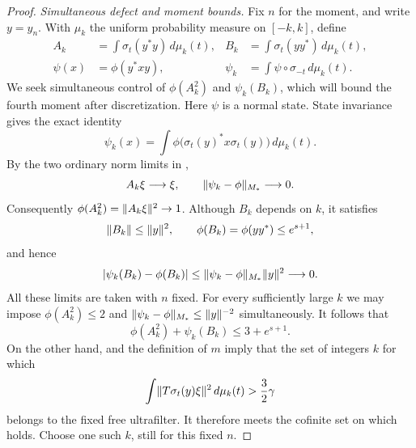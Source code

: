 \begin{proof}
\smallskip
\noindent\emph{Simultaneous defect and moment bounds.}
Fix $n$ for the moment, and write $y=y_n$.  With $\mu_k$ the uniform
probability measure on $[-k,k]$, define
\[
 \begin{aligned}
 A_k&=\int\sigma_t(y^*y)\,d\mu_k(t),&
 B_k&=\int\sigma_t(yy^*)\,d\mu_k(t),\\
 \psi(x)&=\phi(y^*xy),&
 \psi_k&=\int\psi\circ\sigma_{-t}\,d\mu_k(t).
 \end{aligned}
\]
We seek simultaneous control of $\phi(A_k^2)$ and $\psi_k(B_k)$, which
will bound the fourth moment after discretization. Here $\psi$ is a
normal state. State invariance gives the exact identity
\begin{equation}
\label{eq:recovery-functional}
 \psi_k(x)=
 \int\phi\bigl(\sigma_t(y)^*x\sigma_t(y)\bigr)\,d\mu_k(t).
\end{equation}
By the two ordinary norm limits in ,
\[
 A_k\xi\longrightarrow\xi,\qquad
 \lVert\psi_k-\phi\rVert_{M_*}\longrightarrow0.
\]
Consequently $\phi(A_k^2)=\lVert A_k\xi\rVert^{2}\to1$.  Although $B_k$
depends on $k$, it satisfies
\[
 \lVert B_k\rVert\le\lVert y\rVert^{2},\qquad
 \phi(B_k)=\phi(yy^*)\le e^{s+1},
\]
and hence
\begin{equation}
\label{eq:recovery-varying-test}
 \lvert\psi_k(B_k)-\phi(B_k)\rvert
 \le\lVert\psi_k-\phi\rVert_{M_*}\lVert y\rVert^{2}\longrightarrow0.
\end{equation}
All these limits are taken with $n$ fixed.  For every sufficiently large
$k$ we may impose $\phi(A_k^2)\le2$ and
$\lVert\psi_k-\phi\rVert_{M_*}\le\lVert y\rVert^{-2}$ simultaneously.  It follows that
\begin{equation}
\label{eq:recovery-continuous-moments}
 \phi(A_k^2)+\psi_k(B_k)\le3+e^{s+1}.
\end{equation}
On the other hand,  and the definition of $m$
imply that the set of integers $k$ for which
\[
 \int\lVert T\sigma_t(y)\xi\rVert^{2}\,d\mu_k(t)>\frac32\gamma
\]
belongs to the fixed free ultrafilter.  It therefore meets the cofinite
set on which  holds.  Choose one such
$k$, still for this fixed $n$.


\end{proof}
